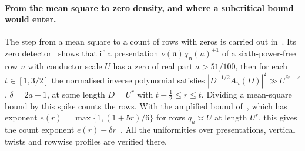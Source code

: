 \documentclass[11pt]{article}
\theoremstyle{remark}
\begin{document}
\paragraph{From the mean square to zero density, and where a subcritical bound would enter.}
The step from a mean square to a count of rows with zeros is carried out in~\cite{OAI78}. Its zero
detector~\cite[Prop.~8.3]{OAI78} shows that if a presentation $\nu(\mathfrak n)\chi_{\mathfrak n}(u)^{\pm1}$
of a sixth-power-free row $u$ with conductor scale $U$ has a zero of real part $a>51/100$, then for
each $t\in[1,3/2]$ the normalised inverse polynomial satisfies $|D^{-1/2}A_u(D)|^2\gg U^{\delta r-\varepsilon}$,
$\delta=2a-1$, at some length $D=U^r$ with $t-\frac12\le r\le t$. Dividing a mean-square bound by
this spike counts the rows. With the amplified bound of~\cite[Lemma~17.6]{OAI78}, which has exponent
$e(r)=\max\{1,(1+5r)/6\}$ for rows $q_u\asymp U$ at length $U^r$, this gives the count exponent
$e(r)-\delta r$~\cite[(19.3)]{OAI78}. All the uniformities over presentations, vertical twists and
rowwise profiles are verified there.
\end{document}

